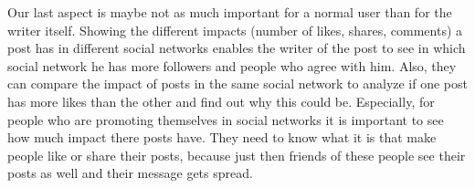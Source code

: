 Our last aspect is maybe not as much important for a normal user than for the writer itself. Showing the different impacts (number of likes, shares, comments) a post has in different social networks enables the writer of the post to see in which social network he has more followers and people who agree with him. Also, they can compare the impact of posts in the same social network to analyze if one post has more likes than the other and find out why this could be.  Especially, for people who are promoting themselves in social networks it is important to see how much impact there posts have. They need to know what it is that make people like or share their posts, because just then friends of these people see their posts as well and their message gets spread. 




